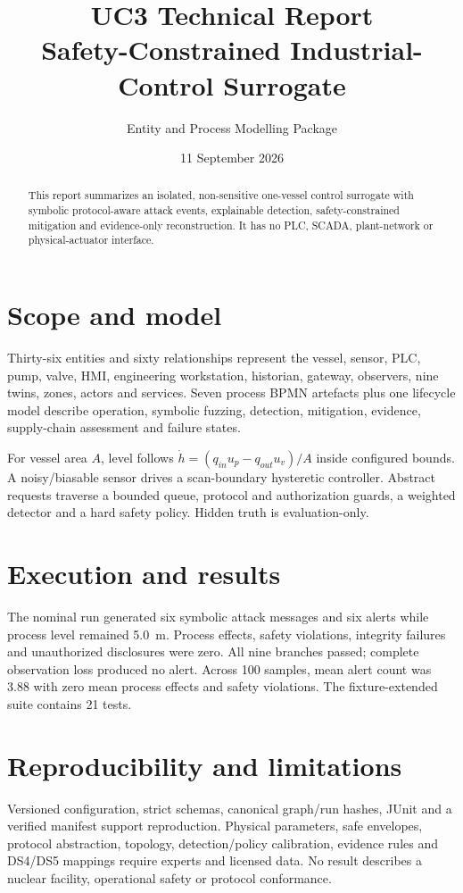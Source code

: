 \documentclass[11pt,a4paper]{article}
\title{UC3 Technical Report\\\large Safety-Constrained Industrial-Control Surrogate}
\author{Entity and Process Modelling Package}\date{11 September 2026}
\begin{document}
\maketitle
\begin{abstract}This report summarizes an isolated, non-sensitive one-vessel control surrogate with symbolic protocol-aware attack events, explainable detection, safety-constrained mitigation and evidence-only reconstruction. It has no PLC, SCADA, plant-network or physical-actuator interface.\end{abstract}
\section{Scope and model}
Thirty-six entities and sixty relationships represent the vessel, sensor, PLC, pump, valve, HMI, engineering workstation, historian, gateway, observers, nine twins, zones, actors and services. Seven process BPMN artefacts plus one lifecycle model describe operation, symbolic fuzzing, detection, mitigation, evidence, supply-chain assessment and failure states.

For vessel area $A$, level follows $\dot h=(q_{in}u_p-q_{out}u_v)/A$ inside configured bounds. A noisy/biasable sensor drives a scan-boundary hysteretic controller. Abstract requests traverse a bounded queue, protocol and authorization guards, a weighted detector and a hard safety policy. Hidden truth is evaluation-only.
\section{Execution and results}
The nominal run generated six symbolic attack messages and six alerts while process level remained 5.0~m. Process effects, safety violations, integrity failures and unauthorized disclosures were zero. All nine branches passed; complete observation loss produced no alert. Across 100 samples, mean alert count was 3.88 with zero mean process effects and safety violations. The fixture-extended suite contains 21 tests.
\section{Reproducibility and limitations}
Versioned configuration, strict schemas, canonical graph/run hashes, JUnit and a verified manifest support reproduction. Physical parameters, safe envelopes, protocol abstraction, topology, detection/policy calibration, evidence rules and DS4/DS5 mappings require experts and licensed data. No result describes a nuclear facility, operational safety or protocol conformance.
\end{document}
